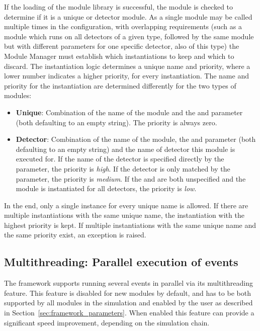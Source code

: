 If the loading of the module library is successful, the module is checked to determine if it is a unique or detector module.
As a single module may be called multiple times in the configuration, with overlapping requirements (such as a module which runs on all detectors of a given type, followed by the same module but with different parameters for one specific detector, also of this type) the Module Manager must establish which instantiations to keep and which to discard.
The instantiation logic determines a unique name and priority, where a lower number indicates a higher priority, for every instantiation.
The name and priority for the instantiation are determined differently for the two types of modules:
\begin{itemize}
\item \textbf{Unique}: Combination of the name of the module and the  and  parameter (both defaulting to an empty string).
The priority is always zero.
\item \textbf{Detector}: Combination of the name of the module, the  and  parameter (both defaulting to an empty string) and the name of detector this module is executed for.
If the name of the detector is specified directly by the  parameter, the priority is \emph{high}.
If the detector is only matched by the  parameter, the priority is \emph{medium}.
If the  and  are both unspecified and the module is instantiated for all detectors, the priority is \emph{low}.
\end{itemize}
In the end, only a single instance for every unique name is allowed.
If there are multiple instantiations with the same unique name, the instantiation with the highest priority is kept.
If multiple instantiations with the same unique name and the same priority exist, an exception is raised.

\subsection{Multithreading: Parallel execution of events}
\label{sec:multithreading}
The framework supports running several events in parallel via its multithreading feature.
This feature is disabled for new modules by default, and has to be both supported by all modules in the simulation and enabled by the user as described in Section~\ref{sec:framework_parameters}.
When enabled this feature can provide a significant speed improvement, depending on the simulation chain.


